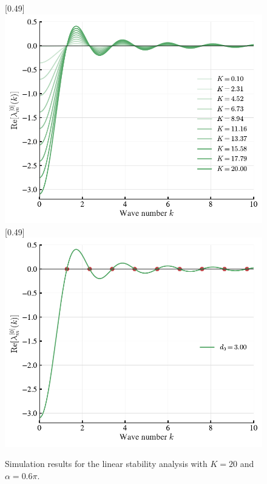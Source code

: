 \documentclass{article}
\begin{document}
\begin{figure}[H]
    \centering
    [0.49\linewidth]{
        \includegraphics[width=\linewidth]{figs/phaseLagPatternFormation_lambda_m_varyK.pdf}
    }
    \hfill
    [0.49\linewidth]{
        \includegraphics[width=\linewidth]{figs/phaseLagPatternFormation_lambda_m_zeroPoint.pdf}
    }
    \caption{
        Simulation results for the linear stability analysis with $K=20$ and $\alpha=0.6\pi$.
    }
\end{figure}
\end{document}
